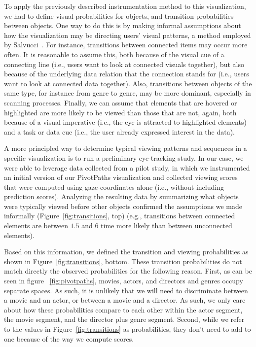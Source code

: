 To apply the previously described instrumentation method to this visualization, we had to define visual probabilities for objects, and transition probabilities between objects. One way to do this is by making informal assumptions about how the visualization may be directing users' visual patterns, a method employed by Salvucci~\cite{salvucci2000intelligent}. For instance, transitions between connected items may occur more often. It is reasonable to assume this, both because of the visual cue of a connecting line (i.e., users want to look at connected visuals together), but also because of the underlying data relation that the connection stands for (i.e., users want to look at connected data together). Also, transitions between objects of the same type, for instance from genre to genre, may be more dominant, especially in scanning processes. Finally, we can assume that elements that are hovered or highlighted are more likely to be viewed than those that are not, again, both because of a visual imperative (i.e., the eye is attracted to highlighted elements) and a task or data cue (i.e., the user already expressed interest in the data).

A more principled way to determine typical viewing patterns and sequences in a specific visualization is to run a preliminary eye-tracking study. In our case, we were able to leverage data collected from a pilot study, in which we instrumented an initial version of our PivotPaths visualization and collected viewing scores that were computed using gaze-coordinates alone (i.e., without including prediction scores). Analyzing the resulting data by summarizing what objects were typically viewed before other objects confirmed the assumptions we made informally (Figure~\ref{fig:transitions}, top) (e.g., transitions between connected elements are between $1.5$ and $6$ time more likely than between unconnected elements). 

Based on this information, we defined the transition and viewing probabilities as shown in Figure~\ref{fig:transitions}, bottom. These transition probabilities do not match directly the observed probabilities for the following reason. First, as can be seen in figure ~\ref{fig:pivotpaths}, movies, actors, and directors and genres occupy separate spaces. As such, it is unlikely that we will need to discriminate between a movie and an actor, or between a movie and a director. As such, we only care about how these probabilities compare to each other within the actor segment, the movie segment, and the director plus genre segment. Second, while we refer to the values in Figure~\ref{fig:transitions} as probabilities, they don't need to add to one because of the way we compute scores. 

